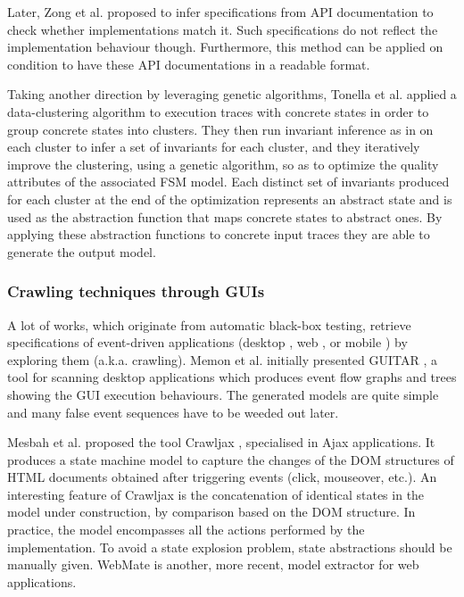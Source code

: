 Later, Zong et al. \cite{ZhongZXM11} proposed to infer
specifications from API documentation to check whether
implementations match it.  Such specifications do not reflect the
implementation behaviour though. Furthermore, this method can be
applied on condition to have these API documentations in a
readable format.

Taking another direction by leveraging genetic algorithms,
Tonella et al. \cite{TonellaNMLH13} applied a data-clustering
algorithm to execution traces with concrete states in order to
group concrete states into clusters. They then run invariant
inference as in \cite{Ernst:1999:DDL:302405.302467,Ernst200735}
on each cluster to infer a set of invariants for each cluster,
and they iteratively improve the clustering, using a genetic
algorithm, so as to optimize the quality attributes of the
associated FSM model. Each distinct set of invariants produced
for each cluster at the end of the optimization represents an
abstract state and is used as the abstraction function that maps
concrete states to abstract ones. By applying these abstraction
functions to concrete input traces they are able to generate the
output model.


\subsubsection{Crawling techniques through GUIs}
\label{sec:related:modelinf:passive-crawling}

A lot of works, which originate from automatic black-box testing,
retrieve specifications of event-driven applications (desktop
\cite{Memon:2003}, web \cite{webmate12}, or mobile
\cite{Amalfitano:2012:UGR:2351676.2351717,Joorabchi:2012:REI:2420240.2420457,WPX13,MobiGUITARIEEESoftware2014})
by exploring them (a.k.a. crawling). Memon et al. initially
presented GUITAR \cite{Memon:2003}, a tool for scanning desktop
applications which produces event flow graphs and trees showing
the GUI execution behaviours. The generated models are quite
simple and many false event sequences have to be weeded out
later.

Mesbah et al. proposed the tool Crawljax \cite{crawljax:tweb12},
specialised in Ajax applications. It produces a state machine
model to capture the changes of the DOM structures of HTML
documents obtained after triggering events (click, mouseover,
etc.). An interesting feature of Crawljax is the concatenation of
identical states in the model under construction, by comparison
based on the DOM structure. In practice, the model encompasses
all the actions performed by the implementation. To avoid a state
explosion problem, state abstractions should be manually given.
WebMate \cite{webmate12} is another, more recent, model extractor
for web applications.

